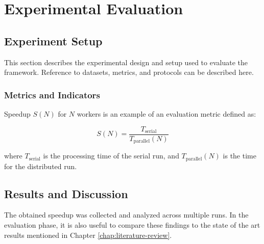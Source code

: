 \chapter{Experimental Evaluation}
\label{chap:experiments}

\section{Experiment Setup}
This section describes the experimental design and setup used to evaluate the framework. Reference to datasets, metrics, and protocols can be described here.

\subsection{Metrics and Indicators}
Speedup $S(N)$ for $N$ workers is an example of an evaluation metric defined as:

\begin{equation}
  \label{eq:example-equation}
  S(N) = \frac{T_{\text{serial}}}{T_{\text{parallel}}(N)}
\end{equation}

where $T_{\text{serial}}$ is the processing time of the serial run, and $T_{\text{parallel}}(N)$ is the time for the distributed run. 

\section{Results and Discussion}
The obtained speedup was collected and analyzed across multiple runs. In the evaluation phase, it is also useful to compare these findings to the state of the art results mentioned in Chapter \ref{chap:literature-review}.
